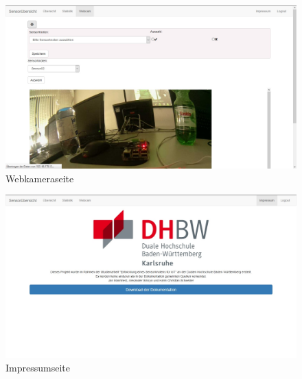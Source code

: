 \begin{landscape}
	\begin{figure}[htb]
		\includegraphics[width=\linewidth, height=.9\textheight]{Bilder/Anhang/webcam.jpg}
		\caption[Webkameraseite]{Webkameraseite}
		\label{webkameraseite}
	\end{figure}
\end{landscape}
\begin{landscape}
	\begin{figure}[htb]
		\includegraphics[width=\linewidth, height=.9\textheight]{Bilder/Anhang/impressum.jpg}
		\caption[Impressumseite]{Impressumseite}
		\label{impressum}
	\end{figure}
\end{landscape}
